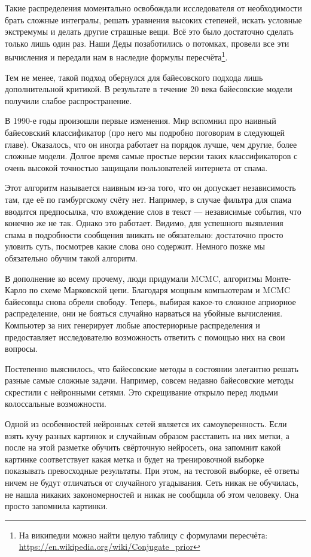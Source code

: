 \documentclass[12pt, a4paper, oneside]{extreport}
\theoremstyle{plain}              %
\theoremstyle{definition}         %
\begin{document}
Такие распределения моментально освобождали исследователя от необходимости брать сложные интегралы, решать уравнения высоких степеней, искать условные экстремумы и делать другие страшные вещи. Всё это было достаточно сделать только лишь один раз. Наши Деды позаботились о потомках, провели все эти вычисления и передали нам в наследие формулы пересчёта\footnote{На википедии можно найти целую таблицу с формулами пересчёта: \url{ https://en.wikipedia.org/wiki/Conjugate_prior}}.

Тем не менее, такой подход обернулся для байесовского подхода лишь дополнительной критикой. В результате в течение 20 века байесовские модели получили слабое распространение.  

В 1990-е годы произошли первые изменения. Мир вспомнил про наивный байесовский классификатор (про него мы подробно поговорим в следующей главе). Оказалось, что он иногда работает на порядок лучше, чем другие, более сложные модели. Долгое время самые простые версии таких классификаторов с очень высокой точностью защищали пользователей интернета от спама. 

Этот алгоритм называется наивным из-за того, что он допускает независимость там, где её по гамбургскому счёту нет. Например, в случае фильтра для спама вводится предпосылка, что вхождение слов в текст --- независимые события, что конечно же не так. Однако это работает. Видимо, для успешного выявления спама в подробности сообщения вникать не обязательно: достаточно просто уловить суть, посмотрев какие слова оно содержит. Немного позже мы обязательно обучим такой алгоритм.

В дополнение ко всему прочему, люди придумали MCMC, алгоритмы Монте-Карло по схеме Марковской цепи. Благодаря мощным компьютерам и MCMC байесовцы снова обрели свободу. Теперь, выбирая какое-то сложное априорное распределение, они не бояться случайно нарваться на убойные вычисления. Компьютер за них генерирует любые апостериорные распределения и предоставляет исследователю возможность ответить с помощью них на свои вопросы. 

Постепенно выяснилось, что байесовские методы в состоянии элегантно решать разные самые сложные задачи.  Например, совсем недавно байесовские методы скрестили с нейронными сетями. Это скрещивание открыло перед людьми колоссальные возможности. 

Одной из особенностей нейронных сетей является их самоуверенность. Если взять кучу разных картинок и случайным образом расставить на них метки, а после на этой разметке обучить свёрточную нейросеть, она запомнит какой картинке соответствует какая метка и будет на тренировочной выборке показывать превосходные результаты. При этом, на тестовой выборке, её ответы ничем не будут отличаться от случайного угадывания. Сеть никак не обучилась, не нашла никаких закономерностей и никак не сообщила об этом человеку. Она просто запомнила картинки.  
\end{document}
